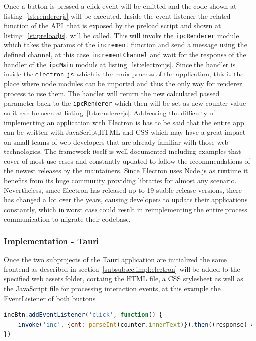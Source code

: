 Once a button is pressed a click event will be emitted and the code shown at listing~\ref{lst:rendererjs} will be executed.
Inside the event listener the related function of the \ac{API}, that is exposed by the preload script and shown at listing~\ref{lst:preloadjs}, will be called.
This will invoke the \texttt{ipcRenderer} module which takes the params of the \texttt{increment} function and send a message using the defined channel, at this case \texttt{incrementChannel} and wait for the response of the handler of the
\texttt{ipcMain} module at listing~\ref{lst:electronjs}.
Since the handler is inside the \texttt{electron.js} which is the main process of the application, this is the place where node modules can be imported and thus the only way for renderer process to use them.
The handler will return the new calculated passed parameter back to the \texttt{ipcRenderer} which then will be set as new counter value as it can be seen at listing~\ref{lst:rendererjs}.
Addressing the difficulty of implementing an application with Electron is has to be said that the entire app can be written with JavaScript,\ac{HTML} and \ac{CSS} which may have a great impact
on small teams of web-developers that are already familiar with those web technologies.
The framework itself is well documented including examples that cover of most use cases and constantly updated to follow the recommendations of the newest releases by the maintainers.
Since Electron uses Node.js as runtime it benefits from its huge community providing libraries for almost any scenario.
Nevertheless, since Electron has released up to 19 stable release versions, there has changed a lot over the years, causing developers to update their applications constantly, which in worst case could result
in reimplementing the entire process communication to migrate their codebase.
\subsubsection{Implementation - Tauri}
Once the two subprojects of the Tauri application are initialized the same frontend as described in section~\ref{subsubsec:impl:electron} will be added to the specified web assets folder,
containg the \ac{HTML} file, a \ac{CSS} stylesheet as well as the JavaScript file for processing interaction events, at this example the EventListener of both buttons.

\begin{lstlisting}[language=JavaScript,label={lst:indexjsTauri}, caption={Excerpt of index.js}]
incBtn.addEventListener('click', function() {
    invoke('inc', {cnt: parseInt(counter.innerText)}).then((response) => counter.innerText=response)
})
\end{lstlisting}

